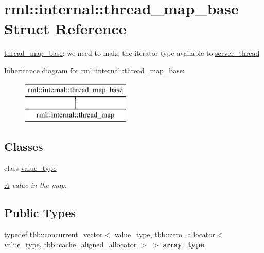 \hypertarget{structrml_1_1internal_1_1thread__map__base}{}\section{rml\+:\+:internal\+:\+:thread\+\_\+map\+\_\+base Struct Reference}
\label{structrml_1_1internal_1_1thread__map__base}


\hyperlink{structrml_1_1internal_1_1thread__map__base}{thread\+\_\+map\+\_\+base}; we need to make the iterator type available to \hyperlink{classrml_1_1internal_1_1server__thread}{server\+\_\+thread}  


Inheritance diagram for rml\+:\+:internal\+:\+:thread\+\_\+map\+\_\+base\+:\begin{figure}[H]
\begin{center}
\leavevmode
\includegraphics[height=2.000000cm]{structrml_1_1internal_1_1thread__map__base}
\end{center}
\end{figure}
\subsection*{Classes}
\begin{DoxyCompactItemize}
\item 
class \hyperlink{classrml_1_1internal_1_1thread__map__base_1_1value__type}{value\+\_\+type}
\begin{DoxyCompactList}\small\item\em \hyperlink{structA}{A} value in the map. \end{DoxyCompactList}\end{DoxyCompactItemize}
\subsection*{Public Types}
\begin{DoxyCompactItemize}
\item 
\hypertarget{structrml_1_1internal_1_1thread__map__base_a62d950feb06200b230be668b31c9e49c}{}typedef \hyperlink{classtbb_1_1concurrent__vector}{tbb\+::concurrent\+\_\+vector}$<$ \hyperlink{classrml_1_1internal_1_1thread__map__base_1_1value__type}{value\+\_\+type}, \hyperlink{classtbb_1_1zero__allocator}{tbb\+::zero\+\_\+allocator}$<$ \hyperlink{classrml_1_1internal_1_1thread__map__base_1_1value__type}{value\+\_\+type}, \hyperlink{classtbb_1_1cache__aligned__allocator}{tbb\+::cache\+\_\+aligned\+\_\+allocator} $>$ $>$ {\bfseries array\+\_\+type}\label{structrml_1_1internal_1_1thread__map__base_a62d950feb06200b230be668b31c9e49c}

\end{DoxyCompactItemize}


